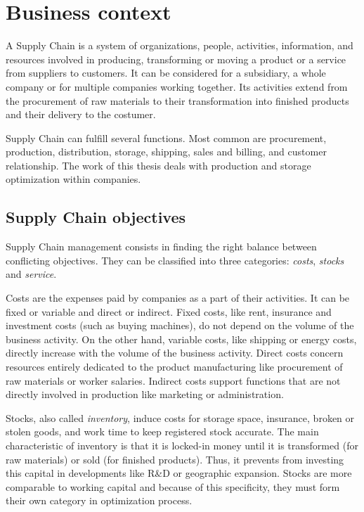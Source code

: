 \chapter{Business context}
\label{chap:business-context}


A Supply Chain is a system of organizations, people, activities, information, and resources involved in producing, transforming or moving a product or a service from suppliers to customers.
It can be considered for a subsidiary, a whole company or for multiple companies working together.
Its activities extend from the procurement of raw materials to their transformation into finished products and their delivery to the costumer.


Supply Chain can fulfill several functions.
Most common are procurement, production, distribution, storage, shipping, sales and billing, and customer relationship.
The work of this thesis deals with production and storage optimization within companies.


\section{Supply Chain objectives}
\label{sec:business-context:supply-chain-objectives}


Supply Chain management consists in finding the right balance between conflicting objectives.
They can be classified into three categories: \emph{costs}, \emph{stocks} and \emph{service}.


Costs are the expenses paid by companies as a part of their activities.
It can be fixed or variable and direct or indirect.
Fixed costs, like rent, insurance and investment costs (such as buying machines), do not depend on the volume of the business activity.
On the other hand, variable costs, like shipping or energy costs, directly increase with the volume of the business activity.
Direct costs concern resources entirely dedicated to the product manufacturing like procurement of raw materials or worker salaries.
Indirect costs support functions that are not directly involved in production like marketing or administration.


Stocks, also called \emph{inventory}, induce costs for storage space, insurance, broken or stolen goods, and work time to keep registered stock accurate.
The main characteristic of inventory is that it is locked-in money until it is transformed (for raw materials) or sold (for finished products).
Thus, it prevents from investing this capital in developments like R\&D or geographic expansion.
Stocks are more comparable to working capital and because of this specificity, they must form their own category in optimization process.



